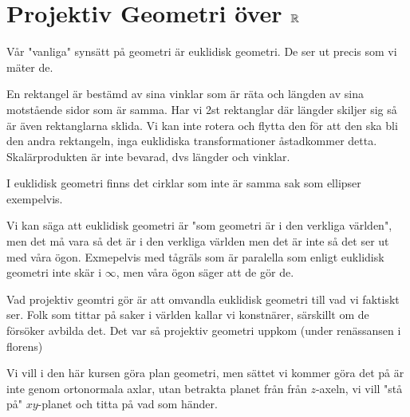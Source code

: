 \section{Projektiv Geometri över $\mathbb{R}$}\par
\noindent Vår "vanliga" synsätt på geometri är euklidisk geometri. De ser ut precis som vi mäter de.
\par\bigskip
\noindent En rektangel är bestämd av sina vinklar som är räta och längden av sina motstående sidor som är samma. Har vi 2st rektanglar där längder skiljer sig så är även rektanglarna sklida. Vi kan inte rotera och flytta den för att den ska bli den andra rektangeln, inga euklidiska transformationer åstadkommer detta. Skalärprodukten är inte bevarad, dvs längder och vinklar.
\par\bigskip
\noindent I euklidisk geometri finns det cirklar som inte är samma sak som ellipser exempelvis.
\par\bigskip
\noindent Vi kan säga att euklidisk geometri är "som geometri är i den verkliga världen", men det må vara så det är i den verkliga världen men det är inte så det ser ut med våra ögon. Exmepelvis med tågräls som är paralella som enligt euklidisk geometri inte skär i $\infty$, men våra ögon säger att de gör de.
\par\bigskip
\noindent Vad projektiv geomtri gör är att omvandla euklidisk geometri till vad vi faktiskt ser. Folk som tittar på saker i världen kallar vi konstnärer, särskillt om de försöker avbilda det. Det var så projektiv geometri uppkom (under renässansen i florens)
\par\bigskip
\noindent Vi vill i den här kursen göra plan geometri, men sättet vi kommer göra det på är inte genom ortonormala axlar, utan betrakta planet från från $z$-axeln, vi vill "stå på" $xy$-planet och titta på vad som händer.
